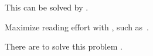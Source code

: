 This can be solved by .

Maximize reading effort with , such as~\badstyle{[17, 8, 42, 6, 99]}.

There are  
to solve this problem .
